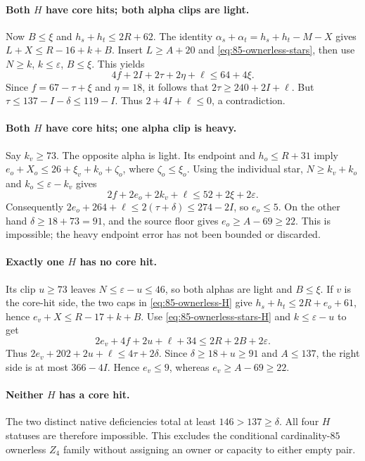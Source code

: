 \paragraph{Both $H$ have core hits; both alpha clips are light.}
Now $B\le\xi$ and $h_s+h_t\le2R+62$. The identity
$\alpha_s+\alpha_t=h_s+h_t-M-X$ gives
$L+X\le R-16+k+B$. Insert $L\ge A+20$ and
\eqref{eq:85-ownerless-stars}, then use
$N\ge k$, $k\le\varepsilon$, $B\le\xi$. This yields
\[
 4f+2I+2\tau+2\eta+\ell\le64+4\xi.
\]
Since $f=67-\tau+\xi$ and $\eta=18$, it follows that
$2\tau\ge240+2I+\ell$. But
$\tau\le137-I-\delta\le119-I$. Thus
$2+4I+\ell\le0$, a contradiction.

\paragraph{Both $H$ have core hits; one alpha clip is heavy.}
Say $k_v\ge73$. The opposite alpha is light. Its endpoint and
$h_o\le R+31$ imply
$e_o+X_o\le26+\xi_v+k_o+\zeta_o$, where
$\zeta_o\le\xi_o$. Using the individual star,
$N\ge k_v+k_o$ and $k_o\le\varepsilon-k_v$ gives
\[
 2f+2e_o+2k_v+\ell\le52+2\xi+2\varepsilon.
\]
Consequently $2e_o+264+\ell\le2(\tau+\delta)
\le274-2I$, so $e_o\le5$. On the other hand
$\delta\ge18+73=91$, and the source floor gives
$e_o\ge A-69\ge22$. This is impossible; the heavy endpoint error
has not been bounded or discarded.

\paragraph{Exactly one $H$ has no core hit.}
Its clip $u\ge73$ leaves $N\le\varepsilon-u\le46$, so both alphas
are light and $B\le\xi$. If $v$ is the core-hit side, the two caps
in \eqref{eq:85-ownerless-H} give
$h_s+h_t\le2R+e_o+61$, hence
$e_v+X\le R-17+k+B$. Use
\eqref{eq:85-ownerless-stars-H} and $k\le\varepsilon-u$ to get
\[
 2e_v+4f+2u+\ell+34\le2R+2B+2\varepsilon.
\]
Thus $2e_v+202+2u+\ell\le4\tau+2\delta$.
Since $\delta\ge18+u\ge91$ and $A\le137$,
the right side is at most $366-4I$. Hence $e_v\le9$,
whereas $e_v\ge A-69\ge22$.

\paragraph{Neither $H$ has a core hit.}
The two distinct native deficiencies total at least $146>137\ge\delta$.
All four $H$ statuses are therefore impossible. This excludes the
conditional cardinality-$85$ ownerless $Z_4$ family without assigning
an owner or capacity to either empty pair.
